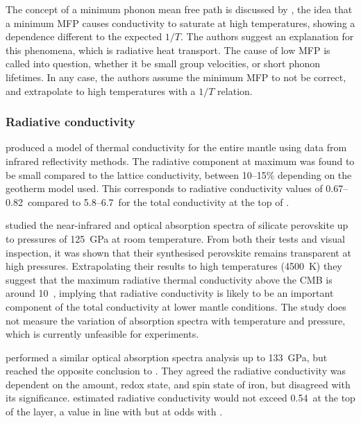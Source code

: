
The concept of a minimum phonon mean free path is discussed by \citet{Ghaderi2017}, the idea that a minimum MFP causes conductivity to saturate at high temperatures, showing a dependence different to the expected $1/T$. The authors suggest an explanation for this phenomena, which is radiative heat transport. The cause of low MFP is called into question, whether it be small group velocities, or short phonon lifetimes. In any case, the authors assume the minimum MFP to not be correct, and extrapolate to high temperatures with a $1/T$ relation.

\subsubsection{Radiative conductivity}
\label{sec:rad_cond}

\citet{Hofmeister1999} produced a model of thermal conductivity for the entire mantle using data from infrared reflectivity methods. The radiative component at maximum was found to be small compared to the lattice conductivity, between 10--15\% depending on the geotherm model used. This corresponds to radiative conductivity values of 0.67--0.82~\wmks compared to 5.8--6.7~\wmks for the total conductivity at the top of \ddd.

\citet{Keppler2008} studied the near-infrared and optical absorption spectra of silicate perovskite up to pressures of 125~GPa at room temperature. From both their tests and visual inspection, it was shown that their synthesised perovskite remains transparent at high pressures. Extrapolating their results to high temperatures (4500~K) they suggest that the maximum radiative thermal conductivity above the CMB is around 10~\wmk, implying that radiative conductivity is likely to be an important component of the total conductivity at lower mantle conditions. The study does not measure the variation of absorption spectra with temperature and pressure, which is currently unfeasible for experiments.

\citet{Goncharov2008} performed a similar optical absorption spectra analysis up to 133~GPa, but reached the opposite conclusion to \citet{Keppler2008}. They agreed the radiative conductivity was dependent on the amount, redox state, and spin state of iron, but disagreed with its significance. \citet{Goncharov2008} estimated radiative conductivity would not exceed 0.54~\wmks at the top of the \ddds layer, a value in line with \citet{Hofmeister1999} but at odds with \citet{Keppler2008}. 


